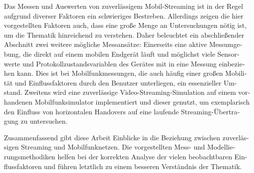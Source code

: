 \begin{german}
Das Messen und Auswerten von zuverlässigem Mobil-Streaming ist in der Regel aufgrund diverser Faktoren ein schwieriges Bestreben. Allerdings zeigen die hier vorgestellten Faktoren auch, dass eine große Menge an Untersuchungen nötig ist, um die Thematik hinreichend zu verstehen. Daher beleuchtet ein abschließender Abschnitt zwei weitere mögliche Messansätze: Einerseits eine aktive Messumgebung, die direkt auf einem mobilen Endgerät läuft und möglichst viele Sensorwerte und Protokollzustandsvariablen des Gerätes mit in eine Messung einbeziehen kann. Dies ist bei Mobilfunkmessungen, die auch häufig einer großen Mobilität und Einflussfaktoren durch den Benutzer unterliegen, ein essenzieller Umstand. Zweitens wird eine zuverlässige Video-Streaming-Simulation auf einem vorhandenen Mobilfunksimulator implementiert und dieser genutzt, um exemplarisch den Einfluss von horizontalen Handovers auf eine laufende Streaming-Übertragung zu untersuchen.

Zusammenfassend gibt diese Arbeit Einblicke in die Beziehung zwischen zuverlässigen Streaming und Mobilfunknetzen. Die vorgestellten Mess- und Modellierungsmethodiken helfen bei der korrekten Analyse der vielen beobachtbaren Einflussfaktoren und führen letztlich zu einem besseren Verständnis der Thematik.
\end{german}